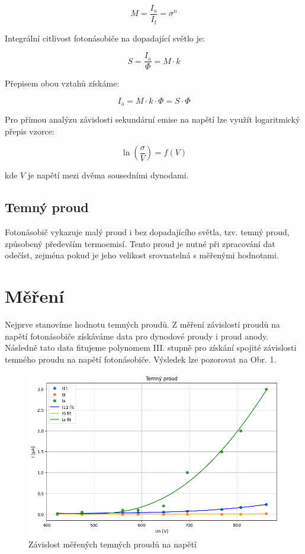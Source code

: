 \documentclass[czech,11pt,a4paper]{article}
\begin{document}
\begin{multicols}{2}
		\begin{equation} M = \frac{I_{\text{a}}}{I_{\text{f}}} = \sigma^n \end{equation}
		
		Integrální citlivost fotonásobiče na dopadající světlo je:
		
		\begin{equation} S = \frac{I_{\text{a}}}{\Phi} = M \cdot k \end{equation}
		
		Přepisem obou vztahů získáme:
		
		\begin{equation} I_{\text{a}} = M \cdot k \cdot \Phi = S \cdot \Phi \end{equation}
		
		Pro přímou analýzu závislosti sekundární emise na napětí lze využít logaritmický přepis vzorce:
		
		\begin{equation} \ln\left(\frac{\sigma}{V}\right) = f(V) \end{equation}
		
		kde $V$ je napětí mezi dvěma sousedními dynodami.
		
		\subsection{Temný proud}
		Fotonásobič vykazuje malý proud i bez dopadajícího světla, tzv. temný proud, způsobený především termoemisí. Tento proud je nutné při zpracování dat odečíst, zejména pokud je jeho velikost srovnatelná s měřenými hodnotami.
		
		\section{Měření}
		Nejprve stanovíme hodnotu temných proudů. Z měření závislostí proudů na napětí fotonásobiče získáváme data pro dynodové proudy i proud anody. Následně tato data fitujeme polynomem III. stupně pro získání spojité závislosti temného proudu na napětí fotonásobiče. Výsledek lze pozorovat na Obr. 1.
		\begin{figure}[H]
			\centering
			\includegraphics[width=0.9\linewidth]{tp}
			\caption{Závislost měřených temných proudů na napětí}
			

\end{figure}
\end{multicols}
\end{document}
